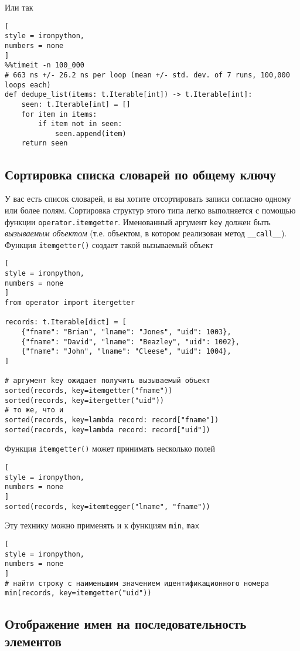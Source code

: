 \documentclass[%
	11pt,
	a4paper,
	utf8,
		]{article}
\begin{document}
Или так
\begin{lstlisting}[
style = ironpython,
numbers = none	
]
%%timeit -n 100_000
# 663 ns +/- 26.2 ns per loop (mean +/- std. dev. of 7 runs, 100,000 loops each)
def dedupe_list(items: t.Iterable[int]) -> t.Iterable[int]:
    seen: t.Iterable[int] = []
    for item in items:
        if item not in seen:
            seen.append(item)
    return seen
\end{lstlisting}

\subsection{Сортировка списка словарей по общему ключу}

У вас есть список словарей, и вы хотите отсортировать записи согласно одному или более полям. Сортировка структур этого типа легко выполняется с помощью функции \texttt{operator.itemgetter}. Именованный аргумент \texttt{key} должен быть \emph{вызываемым объектом} (т.е. объектом, в котором реализован метод \verb|__call__|). Функция \texttt{itemgetter()} создает такой вызываемый объект
\begin{lstlisting}[
style = ironpython,
numbers = none
]
from operator import itergetter

records: t.Iterable[dict] = [
    {"fname": "Brian", "lname": "Jones", "uid": 1003},
    {"fname": "David", "lname": "Beazley", "uid": 1002},
    {"fname": "John", "lname": "Cleese", "uid": 1004},
]

# аргумент key ожидает получить вызываемый объект
sorted(records, key=itemgetter("fname"))
sorted(records, key=itergetter("uid"))
# то же, что и
sorted(records, key=lambda record: record["fname"])
sorted(records, key=lambda record: record["uid"])
\end{lstlisting}

Функция \texttt{itemgetter()} может принимать несколько полей
\begin{lstlisting}[
style = ironpython,
numbers = none
]
sorted(records, key=itemtegger("lname", "fname"))
\end{lstlisting}

Эту технику можно применять и к функциям \texttt{min}, \texttt{max}
\begin{lstlisting}[
style = ironpython,
numbers = none
]
# найти строку с наименьшим значением идентификационного номера
min(records, key=itemgetter("uid"))
\end{lstlisting}

\subsection{Отображение имен на последовательность элементов}
\end{document}
